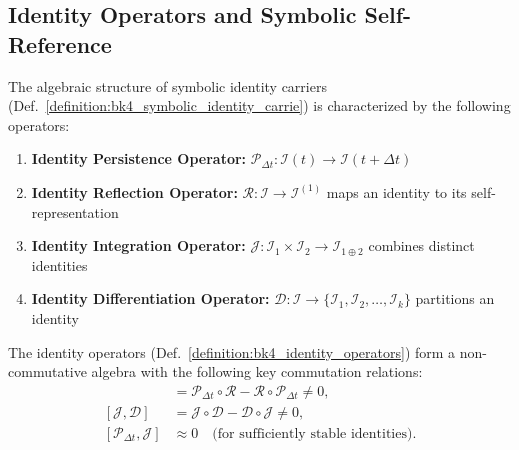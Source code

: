 \subsection{Identity Operators and Symbolic Self-Reference}
\label{subsec:bk4_identity_operators_symbolic_self_reference}

\begin{definition}
\label{definition:bk4_identity_operators}
The algebraic structure of symbolic identity carriers (Def.~\ref{definition:bk4_symbolic_identity_carrie})
is characterized by the following operators:
\begin{enumerate}
    \item \textbf{Identity Persistence Operator:} $\mathcal{P}_{\Delta t}: \mathcal{I}(t) \to \mathcal{I}(t + \Delta t)$
    \item \textbf{Identity Reflection Operator:} $\mathcal{R}: \mathcal{I} \to \mathcal{I}^{(1)}$ maps an identity to its self-representation
    \item \textbf{Identity Integration Operator:} $\mathcal{J}: \mathcal{I}_1 \times \mathcal{I}_2 \to \mathcal{I}_{1 \oplus 2}$ combines distinct identities
    \item \textbf{Identity Differentiation Operator:} $\mathcal{D}: \mathcal{I} \to \{\mathcal{I}_1, \mathcal{I}_2, \ldots, \mathcal{I}_k\}$ partitions an identity
\end{enumerate}
\end{definition}
\begin{theorem}
\label{theorem:bk4_operator_algebra_of_identit}
The identity operators (Def.~\ref{definition:bk4_identity_operators}) form a non-commutative algebra with the following key commutation relations:
\begin{align}
    [\mathcal{P}_{\Delta t}, \mathcal{R}] &= \mathcal{P}_{\Delta t} \circ \mathcal{R} - \mathcal{R} \circ \mathcal{P}_{\Delta t} \neq 0, \\
    [\mathcal{J}, \mathcal{D}] &= \mathcal{J} \circ \mathcal{D} - \mathcal{D} \circ \mathcal{J} \neq 0, \\
    [\mathcal{P}_{\Delta t}, \mathcal{J}] &\approx 0 
    \quad \text{(for sufficiently stable identities)}.
\end{align}
\end{theorem}
